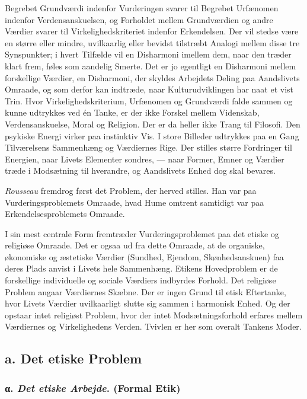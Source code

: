 \documentclass[12pt,a4paper]{book}
\newcommand{\opage}[1]{\marginnote{\footnotesize\textit{[#1]}}}
\newcommand{\apage}[1]{\marginnote{\footnotesize\textit{[#1]}}}
\begin{document}
Begrebet Grundværdi indenfor Vurderingen svarer til \apage{349} Begrebet Urfænomen indenfor
Verdensanskuelsen, og Forholdet mellem Grundværdien og andre Værdier svarer til
Virkelighedskriteriet indenfor Erkendelsen. Der vil stedse være en større eller mindre,
uvilkaarlig eller bevidst tilstræbt Analogi mellem disse tre Synspunkter; i hvert Tilfælde
vil en Disharmoni imellem dem, naar den træder klart frem, føles som aandelig Smerte. Det er jo egentligt en Disharmoni mellem forskellige Værdier, en Disharmoni, der skyldes
Arbejdets Deling paa Aandslivets Omraade, og som derfor kan indtræde, naar Kulturudviklingen
har naat et vist Trin. Hvor Virkelighedskriterium, Urfænomen og Grundværdi falde sammen og
kunne udtrykkes ved én Tanke, er der ikke Forskel mellem Videnskab, Verdensanskuelse, Moral
og Religion. Der er da heller ikke Trang til Filosofi. Den psykiske Energi virker paa
instinktiv Vis. I store Billeder udtrykkes paa en Gang Tilværelsens Sammenhæng og
Værdiernes Rige. Der stilles større Fordringer til Energien, naar Livets Elementer sondres,
--- naar Former, Emner og Værdier træde i Modsætning til hverandre, og Aandslivets Enhed dog
skal bevares.

\emph{Rousseau} fremdrog først det Problem, der herved stilles. Han var paa
Vurderingsproblemets Omraade, hvad Hume omtrent samtidigt var paa Erkendelsesproblemets
Omraade.

I sin mest centrale Form fremtræder Vurderingsproblemet paa det etiske og religiøse
Omraade. Det er ogsaa ud fra dette Omraade, at de organiske, økonomiske og æstetiske
Værdier (Sundhed, Ejendom, Skønhedsanskuen) faa deres Plads anvist i Livets hele
Sammenhæng. Etikens Hovedproblem er de forskellige individuelle og sociale Værdiers
indbyrdes Forhold. Det religiøse Problem angaar Værdiernes Skæbne. Der er ingen Grund til
etisk Eftertanke, hvor Livets Værdier uvilkaarligt slutte sig sammen i harmonisk Enhed. Og
der opstaar intet religiøst Problem, hvor der intet Modsætningsforhold erfares mellem
Værdiernes og Virkelighedens Verden. Tvivlen er her som overalt Tankens Moder.

\opage{350} \subsection*{a. Det etiske Problem}

\subsubsection*{α. \emph{Det etiske Arbejde}. (Formal Etik)}
\end{document}
